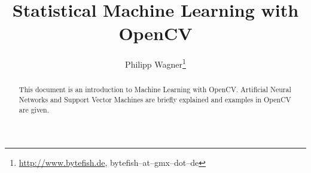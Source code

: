 \documentclass[10pt]{scrartcl}
\author{Philipp Wagner\thanks{\url{http://www.bytefish.de}, bytefish--at--gmx--dot--de}}
\title{Statistical Machine Learning with OpenCV}
\begin{document}
\maketitle

\begin{abstract}
This document is an introduction to Machine Learning with OpenCV. Artificial Neural Networks and Support Vector Machines are briefly explained and examples in OpenCV are given.
\end{abstract}








\appendix



\end{document}
